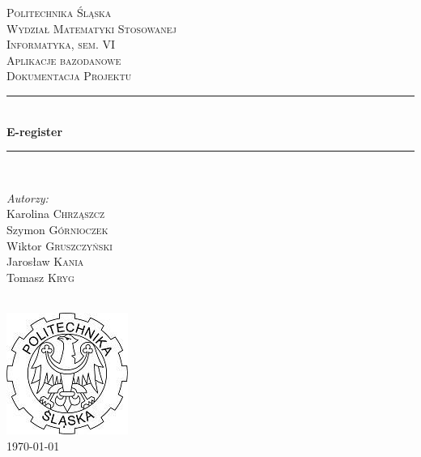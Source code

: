 \documentclass[12pt, titlepage]{article}
\begin{document}
\begin{titlepage}

\newcommand{\HRule}{\rule{\linewidth}{0.5mm}} %

\center 

\textsc{\LARGE Politechnika Śląska}\\[1.5cm] 

\textsc{\Large Wydział Matematyki Stosowanej}\\ 
\textsc{\Large Informatyka, sem. VI}\\[1cm]

\textsc{\large Aplikacje bazodanowe}\\
\textsc{\large Dokumentacja Projektu}\\[0.7cm] 


\HRule \\[0.7cm]
{ \huge \bfseries E-register}\\[0.4cm] 
\HRule \\[1.5cm]
 
\begin{minipage}{0.8\textwidth}
\begin{flushleft} \large
\emph{Autorzy:}\\
Karolina \textsc{Chrząszcz}\\
Szymon \textsc{Górnioczek}\\
Wiktor \textsc{Gruszczyński}\\
Jarosław \textsc{Kania}\\
Tomasz \textsc{Kryg}\\
\end{flushleft}
\end{minipage}\\[1cm]

\includegraphics[scale=0.5]{img/logo.jpg}\\[1cm]
{\large \today}\\[0.5cm] 

\vfill %

\end{titlepage}
\end{document}
